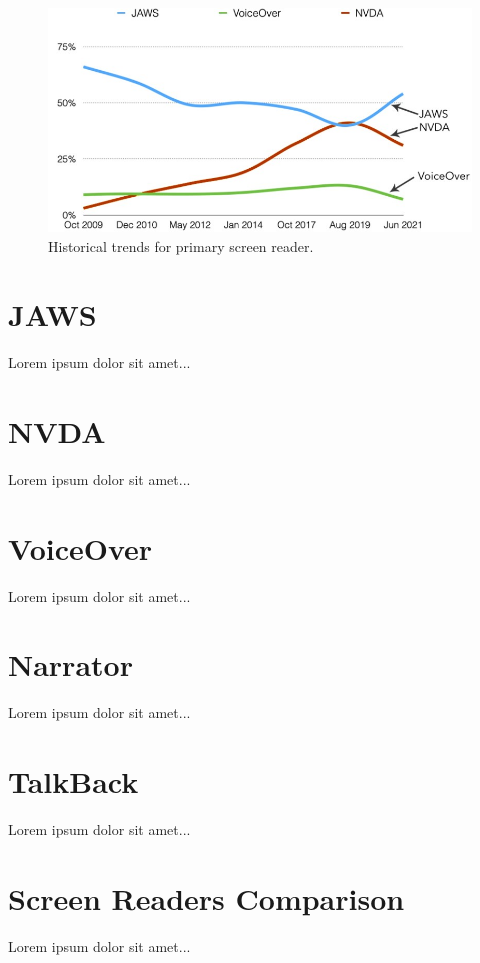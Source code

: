 \begin{figure}[tp]
\centering
\includegraphics[keepaspectratio,width=\linewidth,height=\halfh]
{images/screen-readers-line.jpg}

\caption[Historical trends for primary screen reader]{
Historical trends for primary screen reader.
}
\label{fig:screen-readers-line}
\end{figure}




\section{JAWS}

Lorem ipsum dolor sit amet...

\section{NVDA}

Lorem ipsum dolor sit amet...

\section{VoiceOver}

Lorem ipsum dolor sit amet...

\section{Narrator}

Lorem ipsum dolor sit amet...

\section{TalkBack}

Lorem ipsum dolor sit amet...

\section{Screen Readers Comparison}

Lorem ipsum dolor sit amet...


